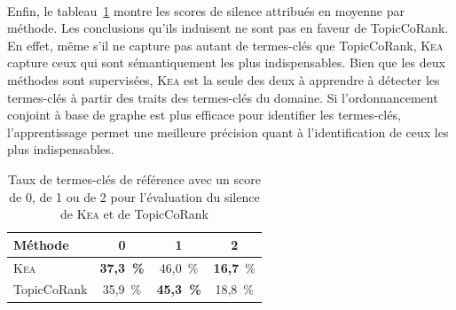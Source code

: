         ~\\Enfin, le
        tableau~\ref{tab:main-domain_specific_keyphrase_annotation-manual_evaluation-analysis-topiccorank-silence_score_ratio}
        montre les scores de silence attribués en moyenne par méthode. Les
        conclusions qu'ils induisent ne sont pas en faveur de
        TopicCoRank. En effet, même s'il ne capture pas autant de termes-clés
        que TopicCoRank, \textsc{Kea} capture ceux qui sont sémantiquement les
        plus indispensables. Bien que les deux méthodes sont supervisées,
        \textsc{Kea} est la seule des deux à apprendre à détecter les
        termes-clés à partir des traits des termes-clés du domaine. Si
        l'ordonnancement conjoint à base de graphe est plus efficace pour
        identifier les termes-clés, l'apprentissage permet une meilleure
        précision quant à l'identification de ceux les plus indispensables.
        \begin{table}[h!]
          \centering
          \begin{tabular}{l|c|c|c}
            \toprule
            \textbf{Méthode} & \textbf{0} & \textbf{1} & \textbf{2}\\
            \hline
            \textsc{Kea} & \textbf{37,3~\%} & 46,0~\% & \textbf{16,7}~\%\\
            TopicCoRank & 35,9~\% & \textbf{45,3~\%} & 18,8~\%\\
            \bottomrule
          \end{tabular}
          \caption{Taux de termes-clés de référence avec un score de 0, de 1 ou
                   de 2 pour l'évaluation du silence de \textsc{Kea} et de
                   TopicCoRank
                   \label{tab:main-domain_specific_keyphrase_annotation-manual_evaluation-analysis-topiccorank-silence_score_ratio}}
        \end{table}

